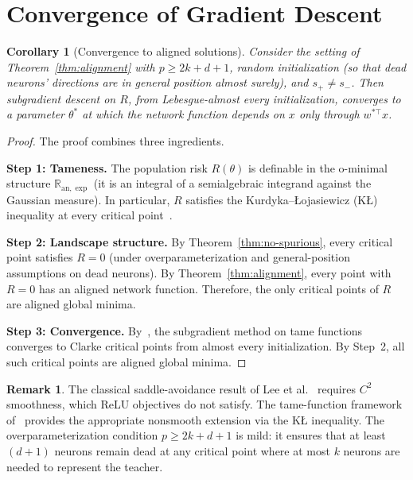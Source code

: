 \documentclass[11pt]{amsart}
\newtheorem{corollary}[theorem]{Corollary}
\theoremstyle{definition}
\newtheorem{remark}[theorem]{Remark}
\newcommand{\R}{\mathbb{R}}
\begin{document}
\section{Convergence of Gradient Descent}\label{sec:convergence}

\begin{corollary}[Convergence to aligned solutions]\label{cor:convergence}
Consider the setting of Theorem~\ref{thm:alignment} with
$p \geq 2k + d + 1$, random initialization (so that dead neurons' directions
are in general position almost surely), and $s_+ \neq s_-$.  Then
subgradient descent on $R$, from Lebesgue-almost every initialization,
converges to a parameter $\theta^*$ at which the network function depends on
$x$ only through $w^{*\top}x$.
\end{corollary}

\begin{proof}
The proof combines three ingredients.

\medskip

\noindent\textbf{Step 1: Tameness.}
The population risk $R(\theta)$ is definable in the o-minimal structure
$\R_{\mathrm{an}, \exp}$ (it is an integral of a semialgebraic integrand
against the Gaussian measure).  In particular, $R$ satisfies the
Kurdyka--\L{}ojasiewicz (K\L{}) inequality at every critical
point~\cite{davis2020}.

\medskip

\noindent\textbf{Step 2: Landscape structure.}
By Theorem~\ref{thm:no-spurious}, every critical point satisfies $R = 0$
(under overparameterization and general-position assumptions on dead
neurons).  By Theorem~\ref{thm:alignment}, every point with $R = 0$ has an
aligned network function.  Therefore, the only critical points of $R$ are
aligned global minima.

\medskip

\noindent\textbf{Step 3: Convergence.}
By~\cite[Theorem~4.1]{davis2020}, the subgradient method on tame functions
converges to Clarke critical points from almost every initialization.  By
Step~2, all such critical points are aligned global minima.
\end{proof}

\begin{remark}\label{rem:convergence-caveats}
The classical saddle-avoidance result of Lee et al.~\cite{lee2016} requires
$C^2$ smoothness, which ReLU objectives do not satisfy.  The tame-function
framework of~\cite{davis2020} provides the appropriate nonsmooth extension
via the K\L{} inequality.  The overparameterization condition $p \geq 2k+d+1$
is mild: it ensures that at least $(d+1)$ neurons remain dead at any critical
point where at most $k$ neurons are needed to represent the teacher.
\end{remark}
\end{document}
